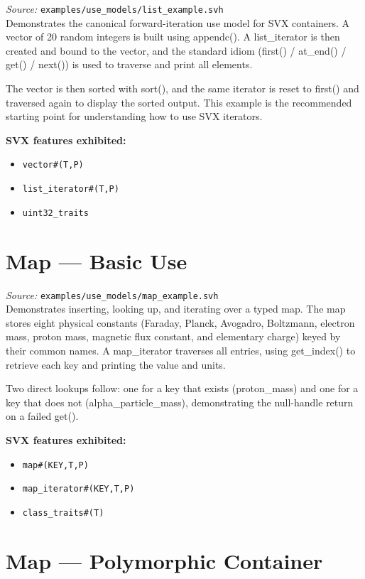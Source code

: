 \documentclass[11pt,letterpaper]{report}
\begin{document}
\textit{Source:} \texttt{examples/use\_models/list\_example.svh}\\

Demonstrates the canonical forward-iteration use model for SVX containers. A vector of 20 random integers is built using appendc(). A list\_iterator is then created and bound to the vector, and the standard idiom (first() / at\_end() / get() / next()) is used to traverse and print all elements.

The vector is then sorted with sort(), and the same iterator is reset to first() and traversed again to display the sorted output. This example is the recommended starting point for understanding how to use SVX iterators.

\textbf{SVX features exhibited:}

\begin{itemize}
  \item \texttt{vector\#(T,P)}
  \item \texttt{list\_iterator\#(T,P)}
  \item \texttt{uint32\_traits}
\end{itemize}
\section{Map --- Basic Use}

\textit{Source:} \texttt{examples/use\_models/map\_example.svh}\\

Demonstrates inserting, looking up, and iterating over a typed map. The map stores eight physical constants (Faraday, Planck, Avogadro, Boltzmann, electron mass, proton mass, magnetic flux constant, and elementary charge) keyed by their common names. A map\_iterator traverses all entries, using get\_index() to retrieve each key and printing the value and units.

Two direct lookups follow: one for a key that exists (proton\_mass) and one for a key that does not (alpha\_particle\_mass), demonstrating the null-handle return on a failed get().

\textbf{SVX features exhibited:}

\begin{itemize}
  \item \texttt{map\#(KEY,T,P)}
  \item \texttt{map\_iterator\#(KEY,T,P)}
  \item \texttt{class\_traits\#(T)}
\end{itemize}
\section{Map --- Polymorphic Container}
\end{document}
